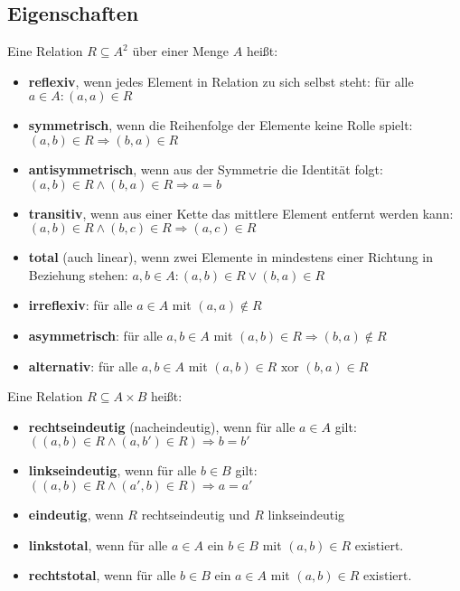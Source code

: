 \documentclass[10pt,a4paper,twoside,twocolumn]{article}
\begin{document}
	\subsection{Eigenschaften}
	
	Eine Relation $ R \subseteq A^2 $ über einer Menge $ A $ heißt:
	\begin{itemize}
		\setlength\itemsep{0em}
		\item \textbf{reflexiv}, wenn jedes Element in Relation zu sich selbst steht: für alle $ a \in A : (a, a) \in R $
		\item \textbf{symmetrisch}, wenn die Reihenfolge der Elemente keine Rolle spielt: $ (a, b) \in R \Rightarrow (b, a) \in R $
		\item \textbf{antisymmetrisch}, wenn aus der Symmetrie die Identität folgt: $ (a, b) \in R \land (b, a) \in R \Rightarrow a = b $
		\item \textbf{transitiv}, wenn aus einer Kette das mittlere Element entfernt werden kann: $ (a, b) \in R \land (b, c) \in R \Rightarrow (a, c) \in R $
		\item \textbf{total} (auch linear), wenn zwei Elemente in mindestens einer Richtung in Beziehung stehen: $ a, b \in A : (a, b) \in R \lor (b, a) \in R $
		\item \textbf{irreflexiv}: für alle $ a \in A $ mit $ (a, a) \notin R $
		\item \textbf{asymmetrisch}: für alle $ a, b \in A $ mit $ (a, b) \in R \Rightarrow (b, a) \notin R $
		\item \textbf{alternativ}: für alle $ a, b \in A $ mit $ (a, b) \in R \text{ xor } (b, a) \in R $
	\end{itemize}

	Eine Relation $ R \subseteq A \times B $ heißt:
	\begin{itemize}
		\setlength\itemsep{0em}
		\item \textbf{rechtseindeutig} (nacheindeutig), wenn für alle $ a \in A $ gilt: $ ((a, b) \in R \land (a, b') \in R) \Rightarrow b = b' $
		\item \textbf{linkseindeutig}, wenn für alle $ b \in B $ gilt: $ ((a, b) \in R \land (a', b) \in R) \Rightarrow a = a' $
		\item \textbf{eindeutig}, wenn $ R $ rechtseindeutig und $ R $ linkseindeutig
		\item \textbf{linkstotal}, wenn für alle $ a \in A $ ein $ b \in B $ mit $ (a, b) \in R $ existiert.
		\item \textbf{rechtstotal}, wenn für alle $ b \in B $ ein $ a \in A $ mit $ (a, b) \in R $ existiert.
	\end{itemize}
\end{document}
